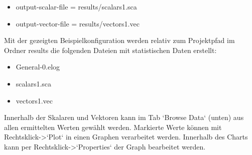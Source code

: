 \begin{itemize}
\item output-scalar-file = results/scalars1.sca
\item output-vector-file = results/vectors1.vec
\end{itemize}

Mit der gezeigten Beispielkonfiguration werden relativ zum Projektpfad im Ordner results die folgenden Dateien mit statistischen Daten erstellt:

\begin{itemize}
\item General-0.elog
\item scalars1.sca
\item vectors1.vec
\end{itemize}

Innerhalb der Skalaren und Vektoren kann im Tab `Browse Data` (unten) aus allen ermittelten Werten gewählt werden. Markierte Werte können mit Rechtsklick->`Plot` in einen Graphen verarbeitet werden. Innerhalb des Charts kann per Rechtsklick->`Properties` der Graph bearbeitet werden.